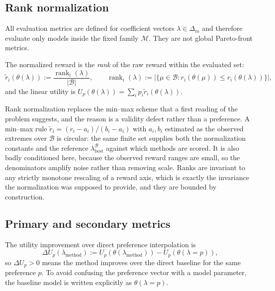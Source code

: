 \documentclass[12pt,a4paper]{report}
\newcommand{\1}{\mathbf{1}}
\newcommand{\Bset}{\mathcal{B}}
\newcommand{\Mfam}{\mathcal{M}}
\theoremstyle{definition}
\begin{document}
\subsection{Rank normalization}
\label{sec:rank-normalization}

All evaluation metrics are defined for coefficient vectors \(\lambda\in\Delta_m\) and therefore evaluate only models inside the fixed family \(\Mfam\). They are not global Pareto-front metrics.

The normalized reward is the \emph{rank} of the raw reward within the evaluated set:
\begin{equation}
\label{eq:rank-norm}
\tilde r_i(\theta(\lambda)):=\frac{\operatorname{rank}_i(\lambda)}{\lvert\Bset\rvert},
\qquad
\operatorname{rank}_i(\lambda):=\bigl\lvert\{\mu\in\Bset: r_i(\theta(\mu))\le r_i(\theta(\lambda))\}\bigr\rvert,
\end{equation}
and the linear utility is \(U_p(\theta(\lambda))=\sum_i p_i\tilde r_i(\theta(\lambda))\).

Rank normalization replaces the min--max scheme that a first reading of the problem suggests, and the reason is a validity defect rather than a preference. A min--max rule \(\tilde r_i=(r_i-a_i)/(b_i-a_i)\) with \(a_i,b_i\) estimated as the observed extremes over \(\Bset\) is circular: the same finite set supplies both the normalization constants and the reference \(\lambda_{\mathrm{best}}^{\Bset}\) against which methods are scored. It is also badly conditioned here, because the observed reward ranges are small, so the denominators amplify noise rather than removing scale. Ranks are invariant to any strictly monotone rescaling of a reward axis, which is exactly the invariance the normalization was supposed to provide, and they are bounded by construction.

\subsection{Primary and secondary metrics}

The utility improvement over direct preference interpolation is
\[
\Delta U_p(\lambda_{\mathrm{method}}):=U_p(\theta(\lambda_{\mathrm{method}}))-U_p(\theta(\lambda=p)),
\]
so \(\Delta U_p>0\) means the method improves over the direct baseline for the same preference \(p\). To avoid confusing the preference vector with a model parameter, the baseline model is written explicitly as \(\theta(\lambda=p)\).
\end{document}

